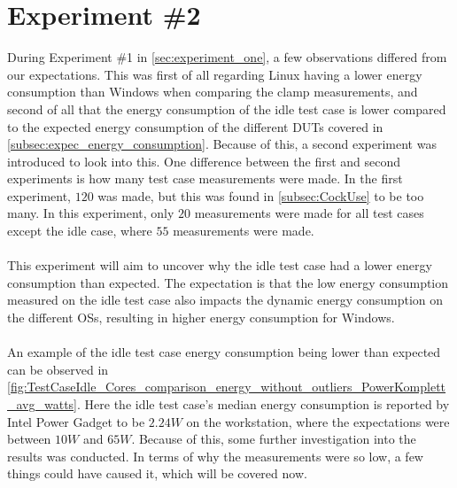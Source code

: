 \section{Experiment \#2}\label{sec:experiment_two}

During Experiment \#1 in \cref{sec:experiment_one}, a few observations differed from our expectations. This was first of all regarding Linux having a lower energy consumption than Windows when comparing the clamp measurements, and second of all that the energy consumption of the idle test case is lower compared to the expected energy consumption of the different DUTs covered in \cref{subsec:expec_energy_consumption}. Because of this, a second experiment was introduced to look into this. One difference between the first and second experiments is how many test case measurements were made. In the first experiment, $120$ was made, but this was found in \cref{subsec:CockUse} to be too many. In this experiment, only $20$ measurements were made for all test cases except the idle case, where $55$ measurements were made.

\paragraph*{}
This experiment will aim to uncover why the idle test case had a lower energy consumption than expected. The expectation is that the low energy consumption measured on the idle test case also impacts the dynamic energy consumption on the different OSs, resulting in higher energy consumption for Windows.

\paragraph*{}
An example of the idle test case energy consumption being lower than expected can be observed in \cref{fig:TestCaseIdle_Cores_comparison_energy_without_outliers_PowerKomplett_avg_watts}. Here the idle test case's median energy consumption is reported by Intel Power Gadget to be $2.24W$ on the workstation, where the expectations were between $10W$ and $65W$. Because of this, some further investigation into the results was conducted. In terms of why the measurements were so low, a few things could have caused it, which will be covered now.



